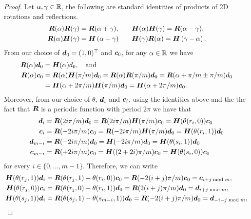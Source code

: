 \documentclass{article} %
\begin{document}
\begin{proof}
Let $\alpha,\gamma \in \mathbb{R}$, the following are standard identities of products of 2D rotations and reflections.
\begin{align*}
\begin{aligned}
{\bm{R}}(\alpha) {\bm{R}}(\gamma) & ={\bm{R}}(\alpha + \gamma), \quad 
 &&{\bm{H}}(\alpha){\bm{H}}(\gamma)  ={\bm{R}}(\alpha- \gamma), \\
{\bm{R}}(\alpha) {\bm{H}}(\gamma) & ={\bm{H}}\left(\alpha+ \gamma\right) 
&&{\bm{H}}(\gamma) {\bm{R}}(\alpha)  ={\bm{H}}\left(\gamma-\alpha\right).
\end{aligned}
\end{align*}
From our choice of ${\bm{d}}_0 = (1,0)^\top$ and ${\bm{c}}_0$, for any $\alpha \in \mathbb{R}$ we have 
\begin{align*}
    {\bm{R}}(\alpha){\bm{d}}_0 &={\bm{H}}(\alpha)d_0, \quad \text{and}  \\
    {\bm{R}}(\alpha){\bm{c}}_0&={\bm{R}}(\alpha){\bm{H}}(\pi/m){\bm{d}}_0 = {\bm{R}}(\alpha){\bm{R}}(\pi/m){\bm{d}}_0 = {\bm{R}}(\alpha + \pi/m \pm \pi/m)d_0 \\
    &={\bm{H}}(\alpha + 2 \pi/m) {\bm{H}}(\pi/m){\bm{d}}_0 = {\bm{H}}(\alpha + 2 \pi/m) {\bm{c}}_0.
\end{align*}
Moreover, from our choice of $\theta$, ${\bm{d}}_i$ and ${\bm{c}}_i$, using the identities above and the the fact that ${\bm{R}}$ is a periodic function with period $2\pi$ we have that
\begin{align*}
     {\bm{d}}_i &= {\bm{R}}(2i\pi/m){\bm{d}}_0 
     = {\bm{R}}(2i\pi/m){\bm{H}}(\pi/m){\bm{c}}_0 
     = {\bm{H}}(\theta(r_i,0)){\bm{c}}_0 \\  
{\bm{c}}_i &= {\bm{R}}(-2i\pi/m){\bm{c}}_0 
     = {\bm{R}}(-2i\pi/m){\bm{H}}(\pi/m){\bm{d}}_0 
      = {\bm{H}}(\theta(r_i,1)){\bm{d}}_0 \\
     {\bm{d}}_{m-i} &= {\bm{R}}(-2i\pi/m){\bm{d}}_0 
     = {\bm{H}}(-2i\pi/m){\bm{d}}_0 = {\bm{H}}(\theta(s_{i}, 1)){\bm{d}}_0 \\  
{\bm{c}}_{m-i} &= {\bm{R}}(+2i\pi/m){\bm{c}}_0 
     = {\bm{H}}((2 +2i)\pi/m){\bm{c}}_0 = {\bm{H}}(\theta(s_{i}, 0)){\bm{c}}_0
\end{align*}
for every $i \in \{0,\dots, m-1\}$. 
Therefore, we can write 
\begin{equation}\label{eq:dtoc}
\begin{aligned}
     \mH(\theta(r_j,1))\vd_i 
     &= \mR( \theta(r_j,1) - \theta(r_i,0))\vc_0 
     = \mR(-2(i+j)\pi/m)\vc_0 = \vc_{i+j \bmod m}, \\
     \mH(\theta(r_j,0))\vc_i &= \mR( \theta(r_j,0) - \theta(r_i,1))\vd_0   = \mR(2(i+j)\pi/m)\vd_0 = \vd_{i+j \bmod m}, \\
     \mH(\theta(s_j,1))\vd_i 
     &= \mR( \theta(s_j,1) - \theta(s_{m-i},1))\vd_0 
     = \mR(-2(i+j)\pi/m)\vd_0 = \vd_{-i-j \bmod m}, \\

\end{aligned}
\end{equation}
\end{proof}
\end{document}
